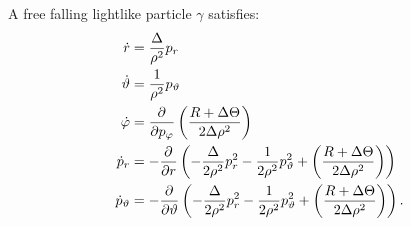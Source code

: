 \begin{theorem}
	\label{theo:eqsmotion}
	A free falling lightlike particle $\gamma$ satisfies:
	\begin{align}
		\dot{r} &= \frac{\Delta}{\rho^2} p_r \\
		\dot{\vartheta} &= \frac{1}{\rho^2}p_\vartheta \\ \label{eq:eqsmotionp}
		\dot{\varphi} &= \frac{\partial^{} }{\partial p_\varphi}\left( \frac{R + \Delta\Theta}{2\Delta\rho^2} \right) \\ \label{eq:eqsmotionpr}
		\dot{p}_r &= - \frac{\partial^{} }{\partial r} \left( - \frac{\Delta}{2\rho^2}p_r^2 - \frac{1}{2\rho^2}p_\vartheta^2 + \left( \frac{R + \Delta\Theta}{2\Delta\rho^2} \right) \right) \\ \label{eq:eqsmotionpt}
		\dot{p}_\vartheta &= - \frac{\partial^{} }{\partial \vartheta} \left( - \frac{\Delta}{2\rho^2}p_r^2 - \frac{1}{2\rho^2}p_\vartheta^2 + \left( \frac{R + \Delta\Theta}{2\Delta\rho^2} \right) \right).
	\end{align}
\end{theorem}